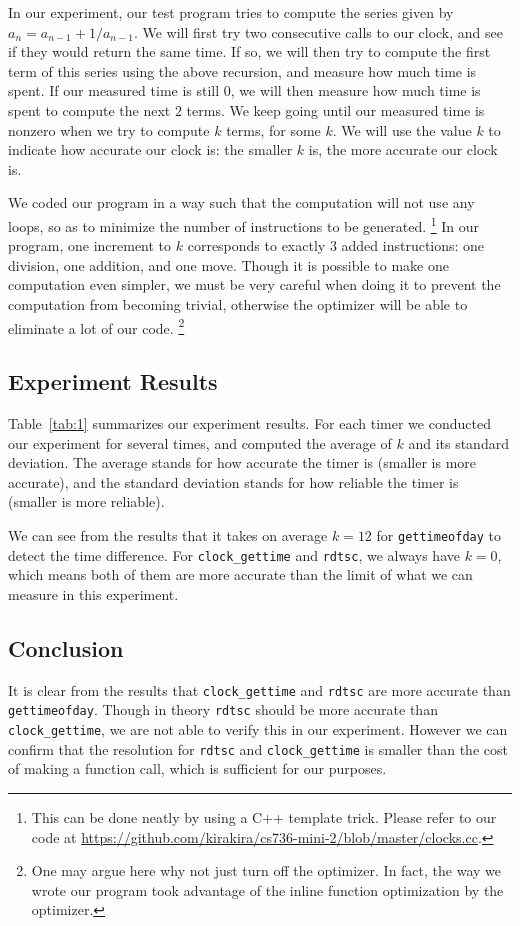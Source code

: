 \documentclass{article}
\begin{document}
In our experiment, our test program tries to compute the series given by $a_n=a_{n-1}+1/a_{n-1}$.
We will first try two consecutive calls to our clock, and see if they would return the same time.
If so, we will then try to compute the first term of this series using the above recursion, and measure how much time is spent.
If our measured time is still $0$, we will then measure how much time is spent to compute the next $2$ terms.
We keep going until our measured time is nonzero when we try to compute $k$ terms, for some $k$.
We will use the value $k$ to indicate how accurate our clock is: the smaller $k$ is, the more accurate our clock is.

We coded our program in a way such that the computation will not use any loops, so as to minimize the number of instructions to be generated.
\footnote{This can be done neatly by using a C++ template trick.
Please refer to our code at \url{https://github.com/kirakira/cs736-mini-2/blob/master/clocks.cc}.}
In our program, one increment to $k$ corresponds to exactly $3$ added instructions: one division, one addition, and one move.
Though it is possible to make one computation even simpler, we must be very careful when doing it to prevent the computation from becoming trivial, otherwise the optimizer will be able to eliminate a lot of our code.
\footnote{One may argue here why not just turn off the optimizer.
In fact, the way we wrote our program took advantage of the inline function optimization by the optimizer.}

\subsection{Experiment Results}
Table~\ref{tab:1} summarizes our experiment results.
For each timer we conducted our experiment for several times, and computed the average of $k$ and its standard deviation.
The average stands for how accurate the timer is (smaller is more accurate), and the standard deviation stands for how reliable the timer is (smaller is more reliable).

We can see from the results that it takes on average $k=12$ for \texttt{gettimeofday} to detect the time difference.
For \texttt{clock\_gettime} and \texttt{rdtsc}, we always have $k=0$, which means both of them are more accurate than the limit of what we can measure in this experiment.

\subsection{Conclusion}
It is clear from the results that \texttt{clock\_gettime} and \texttt{rdtsc} are more accurate than \texttt{gettimeofday}.
Though in theory \texttt{rdtsc} should be more accurate than \texttt{clock\_gettime}, we are not able to verify this in our experiment.
However we can confirm that the resolution for \texttt{rdtsc} and \texttt{clock\_gettime} is smaller than the cost of making a function call, which is sufficient for our purposes.
\end{document}
